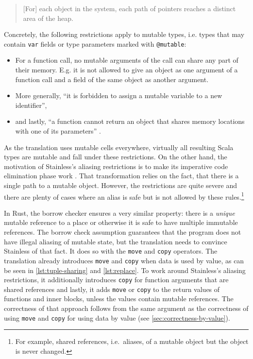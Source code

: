 \begin{quote}
{[}For{]} each object in the system, each path of pointers reaches a
distinct area of the heap. \cite[p.~59]{regb}
\end{quote}

Concretely, the following restrictions apply to mutable types, i.e. types that
may contain \lstinline!var! fields or type parameters marked with
\lstinline!@mutable!:

\begin{itemize}
\tightlist
\item For a function call, no mutable arguments of the call can share
any part of their memory. E.g. it is not allowed to give an object as one
argument of a function call and a field of the same object as another argument.

\item
  More generally, ``it is forbidden to assign a mutable variable to a
  new identifier'',
\item
  and lastly, ``a function cannot return an object that shares memory
  locations with one of its parameters'' \cite[p.~59]{regb}.
\end{itemize}

As the translation uses mutable cells everywhere, virtually all resulting Scala
types are mutable and fall under these restrictions. On the other hand, the
motivation of Stainless's aliasing restrictions is to make its imperative code
elimination phase work \cite{regb}. That transformation relies on the fact, that
there is a single path to a mutable object. However, the restrictions are quite
severe and there are plenty of cases where an alias is safe but is not allowed
by these rules.\footnote{For example, shared references, i.e.~aliases, of a
mutable object but the object is never changed.}

In Rust, the borrow checker ensures a very similar property: there is a
\emph{unique} mutable reference to a place or otherwise it is safe to have
multiple immutable references. The borrow check assumption guarantees that the
program does not have illegal aliasing of mutable state, but the translation
needs to convince Stainless of that fact. It does so with the \lstinline!move!
and \lstinline!copy! operators. The translation already introduces
\lstinline!move! and \lstinline!copy! when data is used by value, as can be seen
in \autoref{lst:tuple-sharing} and \autoref{lst:replace}. To work around
Stainless's aliasing restrictions, it additionally introduces \lstinline!copy!
for function arguments that are shared references and lastly, it adds
\lstinline!move! or \lstinline!copy! to the return values of functions and inner
blocks, unless the values contain mutable references. The correctness of that
approach follows from the same argument as the correctness of using
\lstinline!move! and \lstinline!copy! for using data by value (see
\autoref{sec:correctness-by-value}).

